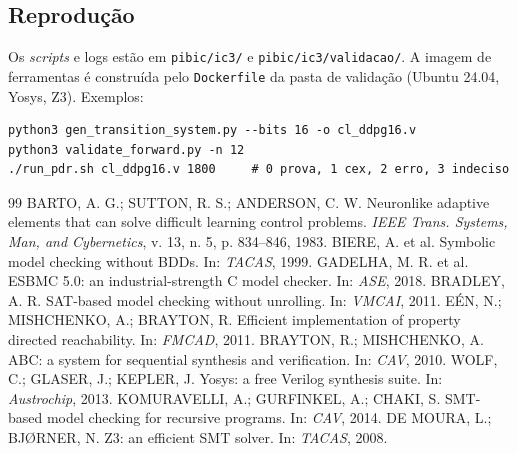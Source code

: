 \documentclass[12pt,openright,oneside,a4paper,chapter=TITLE,sumario=tradicional,english,brazil]{abntex2}
\begin{document}
\begin{apendicesenv}
\chapter{Reprodução}

Os \emph{scripts} e logs estão em \texttt{pibic/ic3/} e \texttt{pibic/ic3/validacao/}. A imagem de ferramentas é construída pelo \texttt{Dockerfile} da pasta de validação (Ubuntu 24.04, Yosys, Z3). Exemplos:

\begin{lstlisting}
python3 gen_transition_system.py --bits 16 -o cl_ddpg16.v
python3 validate_forward.py -n 12
./run_pdr.sh cl_ddpg16.v 1800     # 0 prova, 1 cex, 2 erro, 3 indeciso
\end{lstlisting}
\end{apendicesenv}

\begin{thebibliography}{99}
 BARTO, A. G.; SUTTON, R. S.; ANDERSON, C. W. Neuronlike adaptive elements that can solve difficult learning control problems. \emph{IEEE Trans. Systems, Man, and Cybernetics}, v. 13, n. 5, p. 834--846, 1983.
 BIERE, A. et al. Symbolic model checking without BDDs. In: \emph{TACAS}, 1999.
 GADELHA, M. R. et al. ESBMC 5.0: an industrial-strength C model checker. In: \emph{ASE}, 2018.
 BRADLEY, A. R. SAT-based model checking without unrolling. In: \emph{VMCAI}, 2011.
 EÉN, N.; MISHCHENKO, A.; BRAYTON, R. Efficient implementation of property directed reachability. In: \emph{FMCAD}, 2011.
 BRAYTON, R.; MISHCHENKO, A. ABC: a system for sequential synthesis and verification. In: \emph{CAV}, 2010.
 WOLF, C.; GLASER, J.; KEPLER, J. Yosys: a free Verilog synthesis suite. In: \emph{Austrochip}, 2013.
 KOMURAVELLI, A.; GURFINKEL, A.; CHAKI, S. SMT-based model checking for recursive programs. In: \emph{CAV}, 2014.
 DE MOURA, L.; BJØRNER, N. Z3: an efficient SMT solver. In: \emph{TACAS}, 2008.
\end{thebibliography}
\end{document}
